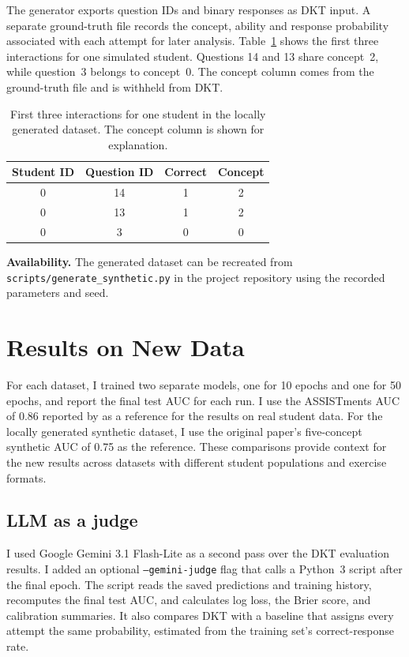 \documentclass[11pt]{article}
\begin{document}
The generator exports question IDs and binary responses as DKT input.
A separate ground-truth file records the concept, ability and response
probability associated with each attempt for later analysis.
Table~\ref{tab:generated-synthetic-input} shows the first three
interactions for one simulated student. Questions 14 and 13 share
concept~2, while question~3 belongs to concept~0. The concept column
comes from the ground-truth file and is withheld from DKT.

\begin{table}[H]
\centering
\small
\begin{tabular}{@{}cccc@{}}
\hline
Student ID & Question ID & Correct & Concept \\
\hline
0 & 14 & 1 & 2 \\
0 & 13 & 1 & 2 \\
0 &  3 & 0 & 0 \\
\hline
\end{tabular}
\caption{First three interactions for one student in the locally
generated dataset. The concept column is shown for explanation.}
\label{tab:generated-synthetic-input}
\end{table}

\textbf{Availability.} The generated dataset can be recreated from
\texttt{scripts/generate\_synthetic.py} in the project repository
using the recorded parameters and seed.

\section{Results on New Data}
For each dataset, I trained two separate models, one for 10 epochs
and one for 50 epochs, and report the final test AUC for each run.
I use the ASSISTments AUC of 0.86 reported by \citet{piech2015deep}
as a reference for the results on real student data. For the
locally generated synthetic dataset, I use the original paper's
five-concept synthetic AUC of 0.75 as the reference. These comparisons
provide context for the new results across datasets with different
student populations and exercise formats.


\subsection{LLM as a judge}

I used Google Gemini 3.1 Flash-Lite as a second pass over the DKT
evaluation results. I added an optional \texttt{--gemini-judge} flag
that calls a Python~3 script after the final epoch. The script reads
the saved predictions and training history, recomputes the final
test AUC, and calculates log loss, the Brier score, and calibration
summaries. It also compares DKT with a baseline that assigns every
attempt the same probability, estimated from the training set's
correct-response rate.
\end{document}
